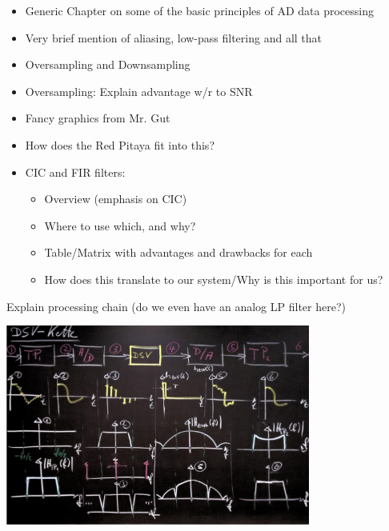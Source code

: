 \documentclass[a4paper,oneside]{alpenthesis/alpenthesis}
\begin{document}
\begin{itemize}
    \item
    Generic Chapter on some of the basic principles of AD data processing
    \item 
    Very brief mention of aliasing, low-pass filtering and all that
    \item
    Oversampling and Downsampling
    \item
    Oversampling: Explain advantage w/r to SNR
    \item
    Fancy graphics from Mr. Gut
    \item
    How does the Red Pitaya fit into this?
    \item
    CIC and FIR filters:
        \begin{itemize}
            \item
            Overview (emphasis on CIC)
            \item
            Where to use which, and why?
            \item
            Table/Matrix with advantages and drawbacks for each
            \item
            How does this translate to our system/Why is this important for us?
        \end{itemize}
\end{itemize}

Explain processing chain (do we even have an analog LP filter here?)

\includegraphics[width=0.75\textwidth]{images/dsvChain}

\end{document}
